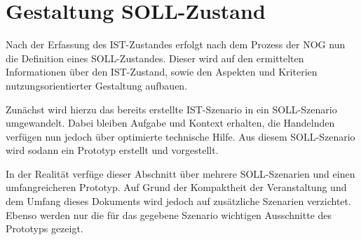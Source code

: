 \chapter{Gestaltung SOLL-Zustand}\label{sec:gestaltung}

Nach der Erfassung des IST-Zustandes erfolgt nach dem Prozess der NOG nun die Definition eines SOLL-Zustandes.
Dieser wird auf den ermittelten Informationen über den IST-Zustand, sowie den Aspekten und Kriterien nutzungsorientierter Gestaltung aufbauen.

Zunächst wird hierzu das bereits erstellte IST-Szenario in ein SOLL-Szenario umgewandelt.
Dabei bleiben Aufgabe und Kontext erhalten, die Handelnden verfügen nun jedoch über optimierte technische Hilfe.
Aus diesem SOLL-Szenario wird sodann ein Prototyp erstellt und vorgestellt.

In der Realität verfüge dieser Abschnitt über mehrere SOLL-Szenarien und einen umfangreicheren Prototyp.
Auf Grund der Kompaktheit der Veranstaltung und dem Umfang dieses Dokuments wird jedoch auf zusätzliche Szenarien verzichtet.
Ebenso werden nur die für das gegebene Szenario wichtigen Ausschnitte des Prototyps gezeigt. 